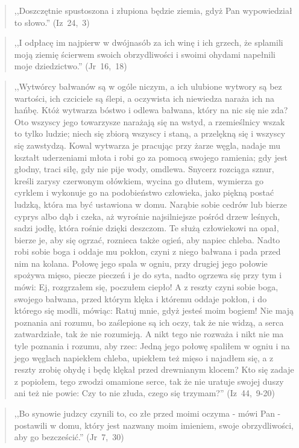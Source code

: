 \documentclass[10pt,a4paper,oneside]{article}
\begin{document}
\begin{quote}
,,Doszczętnie spustoszona i złupiona będzie ziemia, gdyż Pan wypowiedział to słowo.'' \mbox{(Iz 24, 3)}
\end{quote}
\begin{quote}
,,I odpłacę im najpierw w dwójnasób za ich winę i ich grzech, że splamili moją ziemię ścierwem swoich obrzydliwości i swoimi ohydami napełnili moje dziedzictwo.'' \mbox{(Jr 16, 18)}
\end{quote}
\begin{quote}
,,Wytwórcy bałwanów są w ogóle niczym, a ich ulubione wytwory są bez wartości, ich czciciele są ślepi, a oczywista ich niewiedza naraża ich na hańbę. Któż wytwarza bóstwo i odlewa bałwana, który na nic się nie zda? Oto wszyscy jego towarzysze narażają się na wstyd, a rzemieślnicy wszak to tylko ludzie; niech się zbiorą wszyscy i staną, a przelękną się i wszyscy się zawstydzą. Kowal wytwarza je pracując przy żarze węgla, nadaje mu kształt uderzeniami młota i robi go za pomocą swojego ramienia; gdy jest głodny, traci siłę, gdy nie pije wody, omdlewa. Snycerz rozciąga sznur, kreśli zarysy czerwonym ołówkiem, wycina go dłutem, wymierza go cyrklem i wykonuje go na podobieństwo człowieka, jako piękną postać ludzką, która ma być ustawiona w domu. Narąbie sobie cedrów lub bierze cyprys albo dąb i czeka, aż wyrośnie najsilniejsze pośród drzew leśnych, sadzi jodłę, która rośnie dzięki deszczom. Te służą człowiekowi na opał, bierze je, aby się ogrzać, roznieca także ogień, aby napiec chleba. Nadto robi sobie boga i oddaje mu pokłon, czyni z niego bałwana i pada przed nim na kolana. Połowę jego spala w ogniu, przy drugiej jego połowie spożywa mięso, piecze pieczeń i je do syta, nadto ogrzewa się przy tym i mówi: Ej, rozgrzałem się, poczułem ciepło! A z reszty czyni sobie boga, swojego bałwana, przed którym klęka i któremu oddaje pokłon, i do którego się modli, mówiąc: Ratuj mnie, gdyż jesteś moim bogiem! Nie mają poznania ani rozumu, bo zaślepione są ich oczy, tak że nie widzą, a serca zatwardziałe, tak że nie rozumieją. A nikt tego nie rozważa i nikt nie ma tyle poznania i rozumu, aby rzec: Jedną jego połowę spaliłem w ogniu i na jego węglach napiekłem chleba, upiekłem też mięso i najadłem się, a z reszty zrobię ohydę i będę klękał przed drewnianym klocem? Kto się zadaje z popiołem, tego zwodzi omamione serce, tak że nie uratuje swojej duszy ani też nie powie: Czy to nie złuda, czego się trzymam?'' \mbox{(Iz 44, 9-20)}
\end{quote}
\begin{quote}
,,Bo synowie judzcy czynili to, co złe przed moimi oczyma - mówi Pan - postawili w domu, który jest nazwany moim imieniem, swoje obrzydliwości, aby go bezcześcić.'' \mbox{(Jr 7, 30)}
\end{quote}
\end{document}
